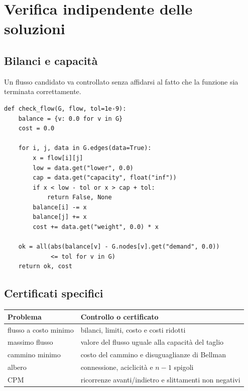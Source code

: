\documentclass[11pt,a4paper]{article}
\begin{document}
\section{Verifica indipendente delle soluzioni}

\subsection{Bilanci e capacità}
Un flusso candidato va controllato senza affidarsi al fatto che la funzione sia terminata correttamente.
\begin{lstlisting}[style=python,caption={Verifica di un flusso nella convenzione $Ax=b$}]
def check_flow(G, flow, tol=1e-9):
    balance = {v: 0.0 for v in G}
    cost = 0.0

    for i, j, data in G.edges(data=True):
        x = flow[i][j]
        low = data.get("lower", 0.0)
        cap = data.get("capacity", float("inf"))
        if x < low - tol or x > cap + tol:
            return False, None
        balance[i] -= x
        balance[j] += x
        cost += data.get("weight", 0.0) * x

    ok = all(abs(balance[v] - G.nodes[v].get("demand", 0.0))
             <= tol for v in G)
    return ok, cost
\end{lstlisting}

\subsection{Certificati specifici}
\begin{center}\begin{tabular}{ll}\toprule
Problema&Controllo o certificato\\\midrule
flusso a costo minimo&bilanci, limiti, costo e costi ridotti\\
massimo flusso&valore del flusso uguale alla capacità del taglio\\
cammino minimo&costo del cammino e disuguaglianze di Bellman\\
albero&connessione, aciclicità e $n-1$ spigoli\\
CPM&ricorrenze avanti/indietro e slittamenti non negativi\\
\bottomrule\end{tabular}\end{center}
\end{document}
